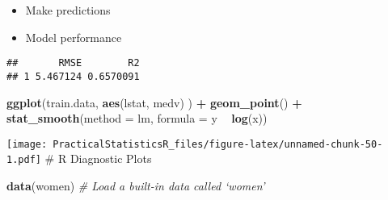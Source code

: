 \documentclass[
]{article}
\newenvironment{Shaded}{\begin{snugshade}}{\end{snugshade}}
\newcommand{\CommentTok}[1]{\textcolor[rgb]{0.56,0.35,0.01}{\textit{#1}}}
\newcommand{\DataTypeTok}[1]{\textcolor[rgb]{0.13,0.29,0.53}{#1}}
\newcommand{\KeywordTok}[1]{\textcolor[rgb]{0.13,0.29,0.53}{\textbf{#1}}}
\newcommand{\NormalTok}[1]{#1}
\newcommand{\OperatorTok}[1]{\textcolor[rgb]{0.81,0.36,0.00}{\textbf{#1}}}
\newcommand{\StringTok}[1]{\textcolor[rgb]{0.31,0.60,0.02}{#1}}
\providecommand{\tightlist}{%
  \setlength{\itemsep}{0pt}\setlength{\parskip}{0pt}}
\begin{document}
\begin{itemize}
\tightlist
\item
  Make predictions
\end{itemize}

\begin{Shaded}
\end{Shaded}

\begin{itemize}
\tightlist
\item
  Model performance
\end{itemize}

\begin{Shaded}
\end{Shaded}

\begin{verbatim}
##       RMSE        R2
## 1 5.467124 0.6570091
\end{verbatim}

\begin{Shaded}
\begin{Highlighting}[]
\KeywordTok{ggplot}\NormalTok{(train.data, }\KeywordTok{aes}\NormalTok{(lstat, medv) ) }\OperatorTok{+}
\StringTok{  }\KeywordTok{geom_point}\NormalTok{() }\OperatorTok{+}
\StringTok{  }\KeywordTok{stat_smooth}\NormalTok{(}\DataTypeTok{method =}\NormalTok{ lm, }\DataTypeTok{formula =}\NormalTok{ y }\OperatorTok{~}\StringTok{ }\KeywordTok{log}\NormalTok{(x))}
\end{Highlighting}
\end{Shaded}

\texttt{[image: PracticalStatisticsR\_files/figure-latex/unnamed-chunk-50-1.pdf]}
\# R Diagnostic Plots

\begin{Shaded}
\begin{Highlighting}[]
\KeywordTok{data}\NormalTok{(women) }\CommentTok{# Load a built-in data called ‘women’}
\end{Highlighting}
\end{Shaded}
\end{document}
